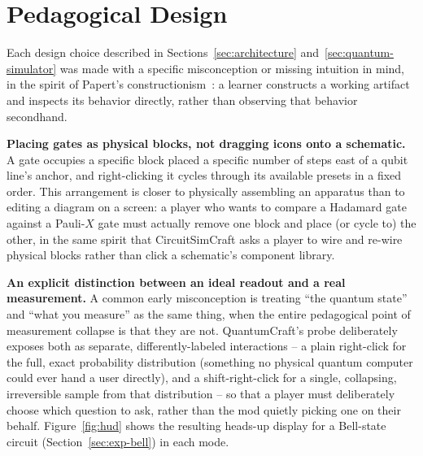 \section{Pedagogical Design}
\label{sec:pedagogy}

Each design choice described in Sections~\ref{sec:architecture}
and~\ref{sec:quantum-simulator} was made with a specific misconception or missing intuition in
mind, in the spirit of Papert's constructionism~\cite{papert1980mindstorms}: a learner
constructs a working artifact and inspects its behavior directly, rather than observing that
behavior secondhand.

\textbf{Placing gates as physical blocks, not dragging icons onto a schematic.} A gate
occupies a specific block placed a specific number of steps east of a qubit line's anchor, and
right-clicking it cycles through its available presets in a fixed order. This arrangement is
closer to physically assembling an apparatus than to editing a diagram on a screen: a player
who wants to compare a Hadamard gate against a Pauli-$X$ gate must actually remove one block
and place (or cycle to) the other, in the same spirit that CircuitSimCraft asks a player to wire
and re-wire physical blocks rather than click a schematic's component library.

\textbf{An explicit distinction between an ideal readout and a real measurement.} A common
early misconception is treating ``the quantum state'' and ``what you measure'' as the same
thing, when the entire pedagogical point of measurement collapse is that they are not.
QuantumCraft's probe deliberately exposes both as separate, differently-labeled interactions
-- a plain right-click for the full, exact probability distribution (something no physical
quantum computer could ever hand a user directly), and a shift-right-click for a single,
collapsing, irreversible sample from that distribution -- so that a player must deliberately
choose which question to ask, rather than the mod quietly picking one on their behalf.
Figure~\ref{fig:hud} shows the resulting heads-up display for a Bell-state circuit
(Section~\ref{sec:exp-bell}) in each mode.

